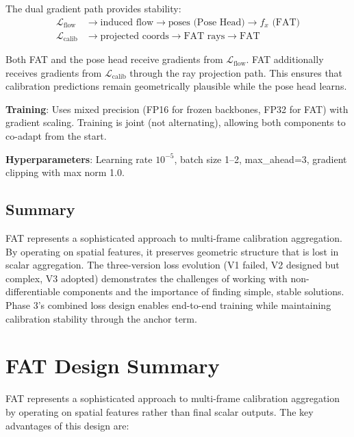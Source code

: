 The dual gradient path provides stability:
\begin{align}
    \mathcal{L}_{\text{flow}} &\to \text{induced flow} \to \text{poses (Pose Head)} \to f_x \text{ (FAT)} \\
    \mathcal{L}_{\text{calib}} &\to \text{projected coords} \to \text{FAT rays} \to \text{FAT}
\end{align}

Both FAT and the pose head receive gradients from $\mathcal{L}_{\text{flow}}$. FAT additionally receives gradients from $\mathcal{L}_{\text{calib}}$ through the ray projection path. This ensures that calibration predictions remain geometrically plausible while the pose head learns.

\textbf{Training}: Uses mixed precision (FP16 for frozen backbones, FP32 for FAT) with gradient scaling. Training is joint (not alternating), allowing both components to co-adapt from the start.

\textbf{Hyperparameters}: Learning rate $10^{-5}$, batch size 1--2, max\_ahead=3, gradient clipping with max norm 1.0.

\subsection{Summary}

FAT represents a sophisticated approach to multi-frame calibration aggregation. By operating on spatial features, it preserves geometric structure that is lost in scalar aggregation. The three-version loss evolution (V1 failed, V2 designed but complex, V3 adopted) demonstrates the challenges of working with non-differentiable components and the importance of finding simple, stable solutions. Phase 3's combined loss design enables end-to-end training while maintaining calibration stability through the anchor term.

\section{FAT Design Summary}\label{sec:fat-summary}

FAT represents a sophisticated approach to multi-frame calibration aggregation by operating on spatial features rather than final scalar outputs. The key advantages of this design are:

